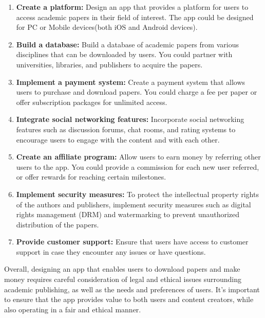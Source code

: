 \documentclass[lettersize,journal]{IEEEtran}
\begin{document}
\begin{enumerate}
  \item \textbf{Create a platform:} Design an app that provides a platform for users to access academic papers in their field of interest. The app could be designed for PC or Mobile devices(both iOS and Android devices).
  \item \textbf{Build a database:} Build a database of academic papers from various disciplines that can be downloaded by users. You could partner with universities, libraries, and publishers to acquire the papers.
  \item \textbf{Implement a payment system:} Create a payment system that allows users to purchase and download papers. You could charge a fee per paper or offer subscription packages for unlimited access.
  \item \textbf{Integrate social networking features:} Incorporate social networking features such as discussion forums, chat rooms, and rating systems to encourage users to engage with the content and with each other.
  \item \textbf{Create an affiliate program:} Allow users to earn money by referring other users to the app. You could provide a commission for each new user referred, or offer rewards for reaching certain milestones.
  \item \textbf{Implement security measures:} To protect the intellectual property rights of the authors and publishers, implement security measures such as digital rights management (DRM) and watermarking to prevent unauthorized distribution of the papers.
  \item \textbf{Provide customer support:} Ensure that users have access to customer support in case they encounter any issues or have questions. 
\end{enumerate}


Overall, designing an app that enables users to download papers and make money requires careful consideration of legal and ethical issues surrounding academic publishing, as well as the needs and preferences of users. It's important to ensure that the app provides value to both users and content creators, while also operating in a fair and ethical manner.
\end{document}
